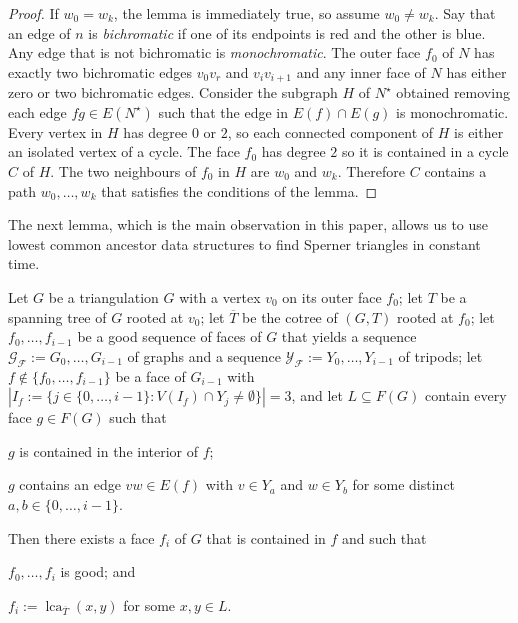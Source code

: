 \documentclass{patmorin}
\DeclareMathOperator{\lca}{lca}
\begin{document}
\begin{proof}
  If $w_0=w_k$, the lemma is immediately true, so assume $w_0\neq w_k$.
  Say that an edge of $n$ is \emph{bichromatic} if one of its endpoints is red and the other is blue.  Any edge that is not bichromatic is \emph{monochromatic}.  The outer face $f_0$ of $N$ has exactly two bichromatic edges $v_0v_r$ and $v_iv_{i+1}$ and any inner face of $N$ has either zero or two bichromatic edges.  Consider the subgraph $H$ of $N^\star$ obtained removing each edge $fg\in E(N^\star)$ such that the edge in $E(f)\cap E(g)$ is monochromatic.  Every vertex in $H$ has degree $0$ or $2$, so each connected component of $H$ is either an isolated vertex of a cycle.  The face $f_0$ has degree $2$ so it is contained in a cycle $C$ of $H$.  The two neighbours of $f_0$ in $H$ are $w_0$ and $w_k$. Therefore $C$ contains a path $w_0,\ldots,w_k$ that satisfies the conditions of the lemma.
\end{proof}

The next lemma, which is the main observation in this paper, allows us to use lowest common ancestor data structures to find Sperner triangles in constant time.

\begin{lem}\label{lca_sperner}
  Let $G$ be a triangulation $G$ with a vertex $v_0$ on its outer face $f_0$; let $T$ be a spanning tree of $G$ rooted at $v_0$; let $\overline{T}$ be the cotree of $(G,T)$ rooted at $f_0$; let $f_0,\ldots,f_{i-1}$ be a good sequence of faces of $G$ that yields a sequence $\mathcal{G_F}:=G_0,\ldots,G_{i-1}$ of graphs and a sequence $\mathcal{Y_F}:=Y_0,\ldots,Y_{i-1}$ of tripods; let $f\not\in \{f_0,\ldots,f_{i-1}\}$ be a face of $G_{i-1}$ with $|I_f:=\{j\in\{0,\ldots,i-1\}:V(I_f)\cap Y_j\neq\emptyset\}|=3$, and let $L\subseteq F(G)$ contain every face $g\in F(G)$ such that
  \begin{compactenum}[(i)]
      \item $g$ is contained in the interior of $f$;
      \item $g$ contains an edge $vw\in E(f)$ with $v\in Y_a$ and $w\in Y_b$ for some distinct $a,b\in\{0,\ldots,i-1\}$.
  \end{compactenum}
  Then there exists a face $f_i$ of $G$ that is contained in $f$ and such that
  \begin{compactenum}[(a)]
    \item $f_0,\ldots,f_i$ is good; and
    \item $f_i :=\lca_{\overline{T}}(x,y)$ for some $x,y\in L$.
  \end{compactenum}
\end{lem}
\end{document}
